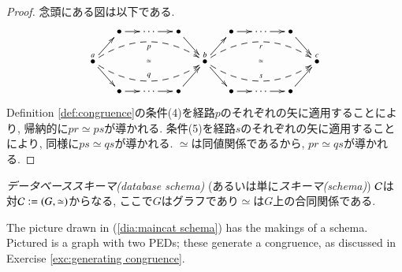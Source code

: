 \begin{proof}


念頭にある図は以下である. $$\xymatrix@=13pt{&\bullet\ar[r]&\cdots\ar[r]&\bullet\ar[dr]&&\bullet\ar[r]&\cdots\ar[r]&\bullet\ar[dr]\\\LMO{a}\ar@{}[rrrr]|{\simeq}\ar[ur]\ar[dr]\ar@{-->}@/^1.5pc/[rrrr]_p\ar@{-->}@/_1.5pc/[rrrr]^q&&&&\LMO{b}\ar@{}[rrrr]|{\simeq}\ar[ur]\ar[dr]\ar@{-->}@/^1.5pc/[rrrr]_r\ar@{-->}@/_1.5pc/[rrrr]^s&&&&\LMO{c}\\&\bullet\ar[r]&\cdots\ar[r]&\bullet\ar[ur]&&\bullet\ar[r]&\cdots\ar[r]&\bullet\ar[ur]}$$ Definition \ref{def:congruence}の条件(4)を経路$p$のそれぞれの矢に適用することにより, 帰納的に$pr\simeq ps$が導かれる. 条件(5)を経路$s$のそれぞれの矢に適用することにより, 同様に$ps\simeq qs$が導かれる. $\simeq$は同値関係であるから, $pr\simeq qs$が導かれる.

\end{proof}

\begin{definition}\label{def:schema}


\emph{データベーススキーマ(database schema)} (あるいは単に\emph{スキーマ(schema)}) $\mathcal{C}$は対$\mathcal{C}:=(G,\simeq)$からなる, ここで$G$はグラフであり$\simeq$は$G$上の合同関係である.

\end{definition}

\begin{example}

The picture drawn in (\ref{dia:maincat schema}) has the makings of a schema. Pictured is a graph with two PEDs; these generate a congruence, as discussed in Exercise \ref{exc:generating congruence}.  

\end{example}

